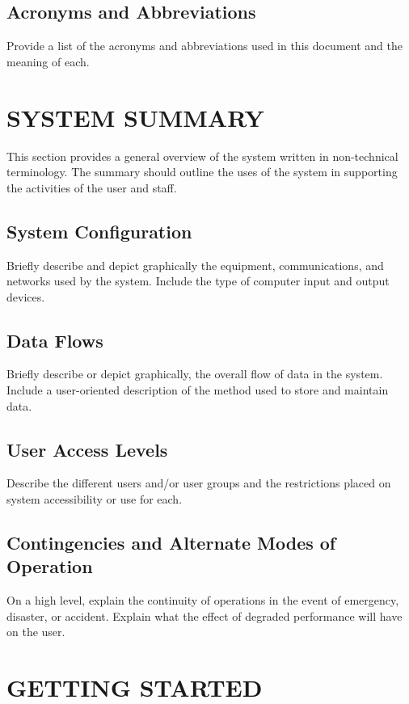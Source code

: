 \documentclass[10pt,letterpaper,extrafontsizes]{memoir}
\begin{document}
\section{Acronyms and Abbreviations}

Provide a list of the acronyms and abbreviations used in this document and the meaning of each.

\chapter{SYSTEM SUMMARY}

This section provides a general overview of the system written in non-technical terminology.  The summary should outline the uses of the system in supporting the activities of the user and staff.

\section{System Configuration}

Briefly describe and depict graphically the equipment, communications, and networks used by the system.  Include the type of computer input and output devices.
\section{Data Flows}

Briefly describe or depict graphically, the overall flow of data in the system.  Include a user-oriented description of the method used to store and maintain data.
\section{User Access Levels}

Describe the different users and/or user groups and the restrictions placed on system accessibility or use for each.
\section{Contingencies and Alternate Modes of Operation}

On a high level, explain the continuity of operations in the event of emergency, disaster, or accident.  Explain what the effect of degraded performance will have on the user.

\chapter{GETTING STARTED}
\end{document}
